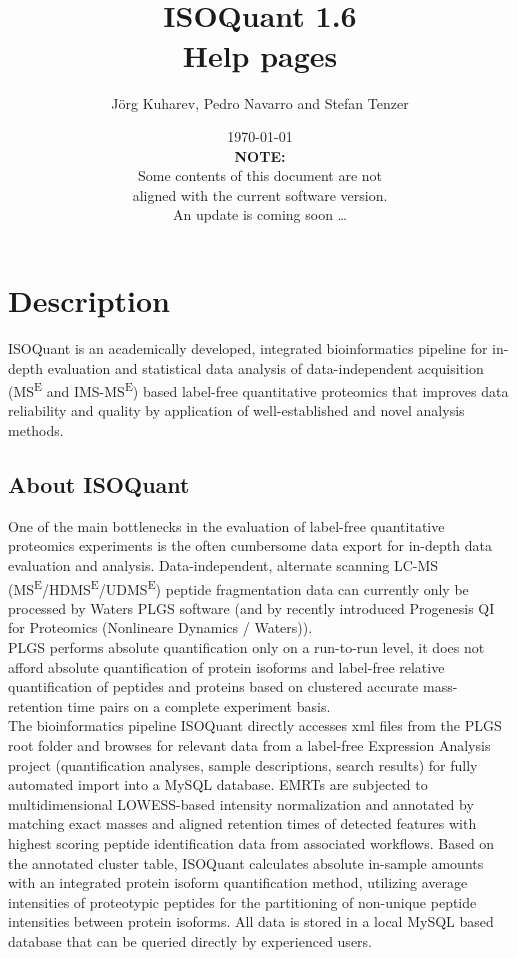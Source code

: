 \documentclass[]{article}
\title{\texttt{\vspace{4cm}}\\
ISOQuant 1.6\\
\textbf{Help pages}}
\author{Jörg Kuharev, Pedro Navarro and Stefan Tenzer}
\date{\today \thispagestyle{empty}\\
\textbf{NOTE:}\\
Some contents of this document are not\\
aligned with the current software version.\\
An update is coming soon \ldots{} \clearpage}
\renewcommand{\baselinestretch}{1.0}\normalsize
\begin{document}
\maketitle

{
\setcounter{tocdepth}{3}
\tableofcontents
}
\clearpage

\renewcommand{\baselinestretch}{1.0}

\normalsize

\section{Description}\label{description}

ISOQuant is an academically developed, integrated bioinformatics
pipeline for in-depth evaluation and statistical data analysis of
data-independent acquisition (MS\textsuperscript{E} and
IMS-MS\textsuperscript{E}) based label-free quantitative proteomics that
improves data reliability and quality by application of well-established
and novel analysis methods.

\subsection{About ISOQuant}\label{about-isoquant}

One of the main bottlenecks in the evaluation of label-free quantitative
proteomics experiments is the often cumbersome data export for in-depth
data evaluation and analysis. Data-independent, alternate scanning LC-MS
(MS\textsuperscript{E}/HDMS\textsuperscript{E}/UDMS\textsuperscript{E})
peptide fragmentation data can currently only be processed by Waters
PLGS software (and by recently introduced Progenesis QI for Proteomics
(Nonlineare Dynamics / Waters)).\\
PLGS performs absolute quantification only on a run-to-run level, it
does not afford absolute quantification of protein isoforms and
label-free relative quantification of peptides and proteins based on
clustered accurate mass-retention time pairs on a complete experiment
basis.\\
The bioinformatics pipeline ISOQuant directly accesses xml files from
the PLGS root folder and browses for relevant data from a label-free
Expression Analysis project (quantification analyses, sample
descriptions, search results) for fully automated import into a MySQL
database. EMRTs are subjected to multidimensional LOWESS-based intensity
normalization and annotated by matching exact masses and aligned
retention times of detected features with highest scoring peptide
identification data from associated workflows. Based on the annotated
cluster table, ISOQuant calculates absolute in-sample amounts with an
integrated protein isoform quantification method, utilizing average
intensities of proteotypic peptides for the partitioning of non-unique
peptide intensities between protein isoforms. All data is stored in a
local MySQL based database that can be queried directly by experienced
users.
\end{document}
